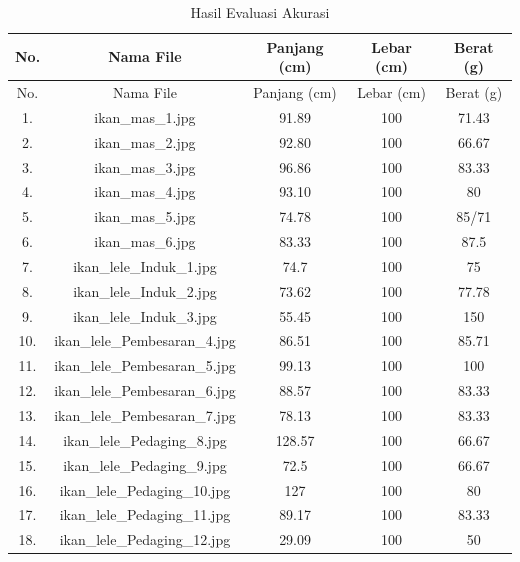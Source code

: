 \begin{longtable}{|c|c|c|c|c|}

        \caption{Hasil Evaluasi Akurasi}\label{tab:allEval} \\
        \hline
        No. & Nama File & Panjang (cm) & Lebar (cm) & Berat (g) \\
        \hline
        \endfirsthead
        \hline
        No. & Nama File & Panjang (cm) & Lebar (cm) & Berat (g) \\
        \hline
        \endhead
        
        1. & ikan\_mas\_1.jpg & 91.89 & 100 & 71.43 \\
        \hline
        2. & ikan\_mas\_2.jpg & 92.80 & 100 & 66.67 \\
        \hline
        3. & ikan\_mas\_3.jpg & 96.86 & 100 & 83.33 \\
        \hline
        4. & ikan\_mas\_4.jpg & 93.10 & 100 & 80 \\
        \hline
        5. & ikan\_mas\_5.jpg & 74.78 & 100 & 85/71 \\
        \hline
        6. & ikan\_mas\_6.jpg & 83.33 & 100 & 87.5 \\
        \hline
        7. & ikan\_lele\_Induk\_1.jpg & 74.7 & 100 & 75 \\
        \hline
        8. & ikan\_lele\_Induk\_2.jpg & 73.62 & 100 & 77.78 \\
        \hline
        9. & ikan\_lele\_Induk\_3.jpg & 55.45 & 100 & 150 \\
        \hline
        10. & ikan\_lele\_Pembesaran\_4.jpg & 86.51 & 100 & 85.71 \\
        \hline
        11. & ikan\_lele\_Pembesaran\_5.jpg & 99.13 & 100 & 100 \\
        \hline
        12. & ikan\_lele\_Pembesaran\_6.jpg & 88.57 & 100 & 83.33 \\
        \hline
        13. & ikan\_lele\_Pembesaran\_7.jpg & 78.13 & 100 & 83.33 \\
        \hline
        14. & ikan\_lele\_Pedaging\_8.jpg & 128.57 & 100 & 66.67 \\
        \hline
        15. & ikan\_lele\_Pedaging\_9.jpg & 72.5 & 100 & 66.67 \\
        \hline
        16. & ikan\_lele\_Pedaging\_10.jpg & 127 & 100 & 80 \\
        \hline
        17. & ikan\_lele\_Pedaging\_11.jpg & 89.17 & 100 & 83.33 \\
        \hline
        18. & ikan\_lele\_Pedaging\_12.jpg & 29.09 & 100 & 50 \\

\end{longtable}
